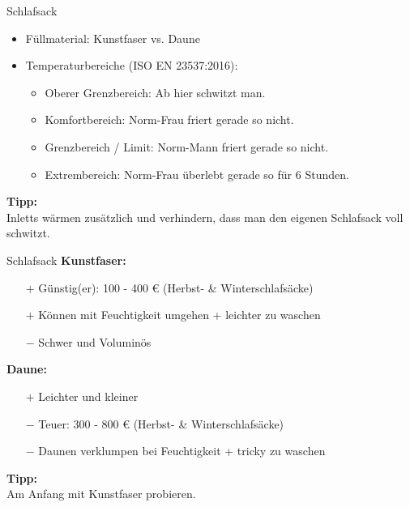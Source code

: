 \documentclass[aspectratio=169]{beamer}
\newcommand{\tipp}[2][Tipp]{\vspace{0.2cm}\textbf{#1:}\\#2}
\begin{document}
			\begin{frame}{Schlafsack}
				\begin{itemize}
					\item Füllmaterial: Kunstfaser vs. Daune
					\item Temperaturbereiche (ISO EN 23537:2016):
					\begin{itemize}
						\item Oberer Grenzbereich: Ab hier schwitzt man.
						\item Komfortbereich: Norm-Frau friert gerade so nicht.
						\item Grenzbereich / Limit: Norm-Mann friert gerade so nicht.
						\item Extrembereich: Norm-Frau überlebt gerade so für 6 Stunden.
					\end{itemize}
				\end{itemize}\pause
				\tipp{Inletts wärmen zusätzlich und verhindern, dass man den eigenen Schlafsack voll schwitzt.}
			\end{frame}
			
			\begin{frame}{Schlafsack}
				\textbf{Kunstfaser:}
				\begin{itemize}
					\item[$+$] Günstig(er): 100 - 400 € (Herbst- \& Winterschlafsäcke)
					\item[$+$] Können mit Feuchtigkeit umgehen + leichter zu waschen
					\item[$-$] Schwer und Voluminös
				\end{itemize}\pause
				\textbf{Daune:}
				\begin{itemize}
					\item[$+$] Leichter und kleiner
					\item[$-$] Teuer: 300 - 800 € (Herbst- \& Winterschlafsäcke)
					\item[$-$] Daunen verklumpen bei Feuchtigkeit + tricky zu waschen
				\end{itemize}\pause
				\tipp{Am Anfang mit Kunstfaser probieren.}
			\end{frame}
			
			
\end{document}
